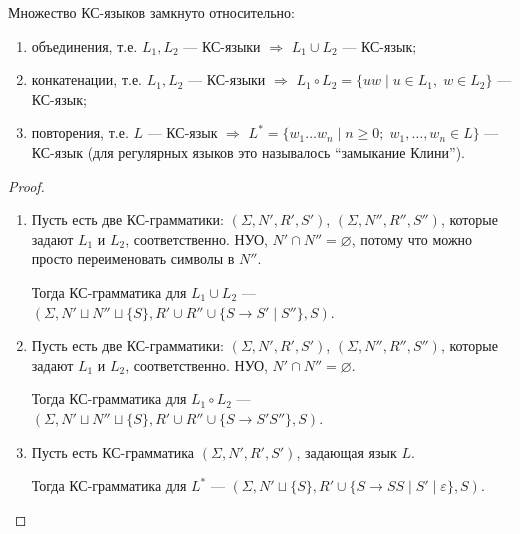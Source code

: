 \begin{theorem}
    Множество КС-языков замкнуто относительно:
    \begin{enumerate}
        \item объединения, т.е. $L_1, L_2$ --- КС-языки $\Rightarrow$ $L_1 \cup L_2$ --- КС-язык;
        \item конкатенации, т.е. $L_1, L_2$ --- КС-языки $\Rightarrow$ $L_1 \circ L_2 = \{ uw \mid u \in L_1, \; w \in L_2 \}$ --- КС-язык;
        \item повторения, т.е. $L$ --- КС-язык $\Rightarrow$ $L^* = \{w_1 \dots w_n \mid n \geqslant 0; \; w_1, \dots, w_n \in L \}$ --- КС-язык (для регулярных языков это называлось ``замыкание Клини'').
    \end{enumerate}
\end{theorem}
\begin{proof} $ $

    \begin{enumerate}
        \item Пусть есть две КС-грамматики: $(\Sigma, N', R', S')$, $(\Sigma, N'', R'', S'')$, которые задают $L_1$ и $L_2$, соответственно. НУО, $N' \cap N'' = \varnothing$, потому что можно просто переименовать символы в $N''$. 
        
        Тогда КС-грамматика для $L_1 \cup L_2$ --- $(\Sigma, N' \sqcup N'' \sqcup \{S\}, R' \cup R'' \cup \{ S \to S' \mid S'' \}, S )$. 

        \item Пусть есть две КС-грамматики: $(\Sigma, N', R', S')$, $(\Sigma, N'', R'', S'')$, которые задают $L_1$ и $L_2$, соответственно. НУО, $N' \cap N'' = \varnothing$. 
        
        Тогда КС-грамматика для $L_1 \circ L_2$ --- $(\Sigma, N' \sqcup N'' \sqcup \{S\}, R' \cup R'' \cup \{ S \to S' S'' \}, S )$. 

        \item Пусть есть КС-грамматика $(\Sigma, N', R', S')$, задающая язык $L$.
        
        Тогда КС-грамматика для $L^*$ --- $(\Sigma, N' \sqcup \{S\}, R' \cup \{ S \to S S \mid S' \mid \varepsilon \}, S )$. 
    \end{enumerate}
\end{proof}